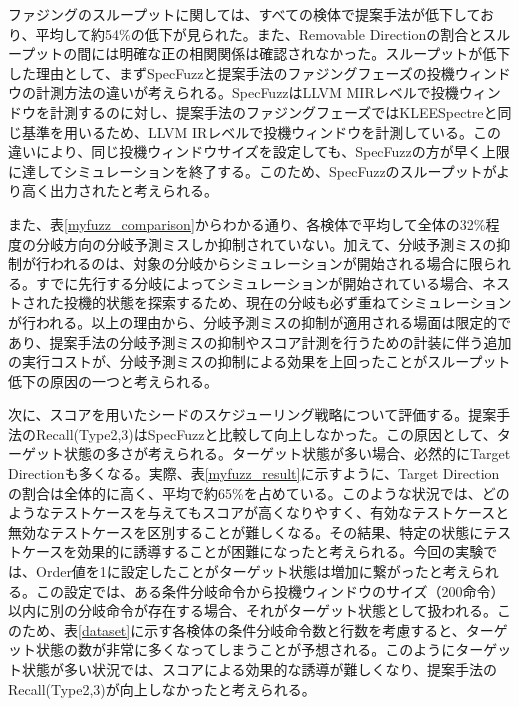ファジングのスループットに関しては、すべての検体で提案手法が低下しており、平均して約54\%の低下が見られた。また、Removable Directionの割合とスループットの間には明確な正の相関関係は確認されなかった。スループットが低下した理由として、まずSpecFuzzと提案手法のファジングフェーズの投機ウィンドウの計測方法の違いが考えられる。SpecFuzzはLLVM MIRレベルで投機ウィンドウを計測するのに対し、提案手法のファジングフェーズではKLEESpectreと同じ基準を用いるため、LLVM IRレベルで投機ウィンドウを計測している。この違いにより、同じ投機ウィンドウサイズを設定しても、SpecFuzzの方が早く上限に達してシミュレーションを終了する。このため、SpecFuzzのスループットがより高く出力されたと考えられる。

また、表\ref{myfuzz_comparison}からわかる通り、各検体で平均して全体の32\%程度の分岐方向の分岐予測ミスしか抑制されていない。加えて、分岐予測ミスの抑制が行われるのは、対象の分岐からシミュレーションが開始される場合に限られる。すでに先行する分岐によってシミュレーションが開始されている場合、ネストされた投機的状態を探索するため、現在の分岐も必ず重ねてシミュレーションが行われる。以上の理由から、分岐予測ミスの抑制が適用される場面は限定的であり、提案手法の分岐予測ミスの抑制やスコア計測を行うための計装に伴う追加の実行コストが、分岐予測ミスの抑制による効果を上回ったことがスループット低下の原因の一つと考えられる。

次に、スコアを用いたシードのスケジューリング戦略について評価する。提案手法のRecall(Type2,3)はSpecFuzzと比較して向上しなかった。この原因として、ターゲット状態の多さが考えられる。ターゲット状態が多い場合、必然的にTarget Directionも多くなる。実際、表\ref{myfuzz_result}に示すように、Target Directionの割合は全体的に高く、平均で約65\%を占めている。このような状況では、どのようなテストケースを与えてもスコアが高くなりやすく、有効なテストケースと無効なテストケースを区別することが難しくなる。その結果、特定の状態にテストケースを効果的に誘導することが困難になったと考えられる。今回の実験では、Order値を1に設定したことがターゲット状態は増加に繋がったと考えられる。この設定では、ある条件分岐命令から投機ウィンドウのサイズ（200命令）以内に別の分岐命令が存在する場合、それがターゲット状態として扱われる。このため、表\ref{dataset}に示す各検体の条件分岐命令数と行数を考慮すると、ターゲット状態の数が非常に多くなってしまうことが予想される。このようにターゲット状態が多い状況では、スコアによる効果的な誘導が難しくなり、提案手法のRecall(Type2,3)が向上しなかったと考えられる。\par


